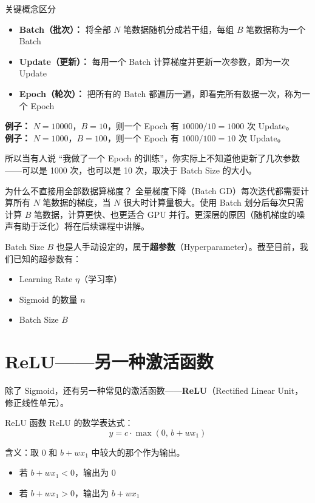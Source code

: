 \documentclass[a4paper]{article}
\begin{document}
\begin{importantbox}{关键概念区分}
    \begin{itemize}
        \item \textbf{Batch（批次）：} 将全部 $N$ 笔数据随机分成若干组，每组 $B$ 笔数据称为一个 Batch
        \item \textbf{Update（更新）：} 每用一个 Batch 计算梯度并更新一次参数，即为一次 Update
        \item \textbf{Epoch（轮次）：} 把所有的 Batch 都遍历一遍，即看完所有数据一次，称为一个 Epoch
    \end{itemize}

    \textbf{例子：} $N=10000$，$B=10$，则一个 Epoch 有 $10000/10 = 1000$ 次 Update。\\
    \textbf{例子：} $N=1000$，$B=100$，则一个 Epoch 有 $1000/100 = 10$ 次 Update。
\end{importantbox}

所以当有人说 ``我做了一个 Epoch 的训练''，你实际上不知道他更新了几次参数——可以是 1000 次，也可以是 10 次，取决于 Batch Size 的大小。

\begin{warningbox}{为什么不直接用全部数据算梯度？}
    全量梯度下降（Batch GD）每次迭代都需要计算所有 $N$ 笔数据的梯度，当 $N$ 很大时计算量极大。使用 Batch 划分后每次只需计算 $B$ 笔数据，计算更快、也更适合 GPU 并行。更深层的原因（随机梯度的噪声有助于泛化）将在后续课程中讲解。
\end{warningbox}

Batch Size $B$ 也是人手动设定的，属于\textbf{超参数}（Hyperparameter）。截至目前，我们已知的超参数有：
\begin{itemize}
    \item Learning Rate $\eta$（学习率）
    \item Sigmoid 的数量 $n$
    \item Batch Size $B$
\end{itemize}

\section{ReLU——另一种激活函数}

除了 Sigmoid，还有另一种常见的激活函数——\textbf{ReLU}（Rectified Linear Unit，修正线性单元）。

\begin{knowledgebox}{ReLU 函数}
    ReLU 的数学表达式：
    \[
    y = c \cdot \max(0,\, b + w x_1)
    \]

    含义：取 $0$ 和 $b + w x_1$ 中较大的那个作为输出。
    \begin{itemize}
        \item 若 $b + w x_1 < 0$，输出为 $0$
        \item 若 $b + w x_1 > 0$，输出为 $b + w x_1$
    \end{itemize}
\end{knowledgebox}
\end{document}
